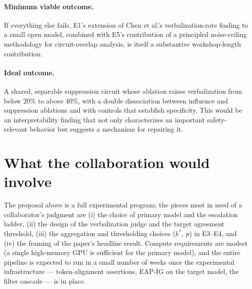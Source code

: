 \documentclass[11pt]{article}
\begin{document}
\paragraph{Minimum viable outcome.} If everything else fails, E1's extension of Chen et al.'s verbalization-rate finding to a small open model, combined with E5's contribution of a principled noise-ceiling methodology for circuit-overlap analysis, is itself a substantive workshop-length contribution.

\paragraph{Ideal outcome.} A shared, separable suppression circuit whose ablation raises verbalization from below 20\% to above 40\%, with a double dissociation between influence and suppression ablations and with controls that establish specificity. This would be an interpretability finding that not only characterizes an important safety-relevant behavior but suggests a mechanism for repairing it.

\section*{What the collaboration would involve}
\label{sec:collab}

The proposal above is a full experimental program; the pieces most in need of a collaborator's judgment are (i) the choice of primary model and the escalation ladder, (ii) the design of the verbalization judge and the target agreement threshold, (iii) the aggregation and thresholding choices ($k^*$, $p$) in E3--E4, and (iv) the framing of the paper's headline result. Compute requirements are modest (a single high-memory GPU is sufficient for the primary model), and the entire pipeline is expected to run in a small number of weeks once the experimental infrastructure --- token-alignment assertions, EAP-IG on the target model, the filter cascade --- is in place.
\end{document}
